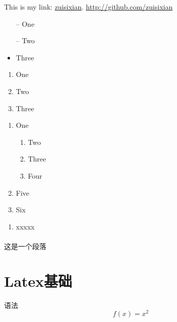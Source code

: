 \documentclass{article}
\begin{document}
    This is my link: \href{http://github.com/zuisixian/}{zuisixian}.
    \url{http://github.com/zuisixian}
    \begin{itemize}
      \item[--] One
      \item[--] Two
      \item Three
    \end{itemize}

    \begin{enumerate}
      \item One
      \item Two
      \item Three
    \end{enumerate}

    \begin{enumerate}
      \item One
        \begin{enumerate}
          \item Two
            \item Three
            \item Four
        \end{enumerate}
        \item Five
        \item Six
    \end{enumerate}
    
    \begin{enumerate}[label=(\roman*)]
      \item xxxxx

    \end{enumerate}


    \paragraph{}
      这是一个段落

    





  \section{Latex基础}
  语法
  \begin{equation}
    f(x) = x^2
  \end{equation}
\end{document}

